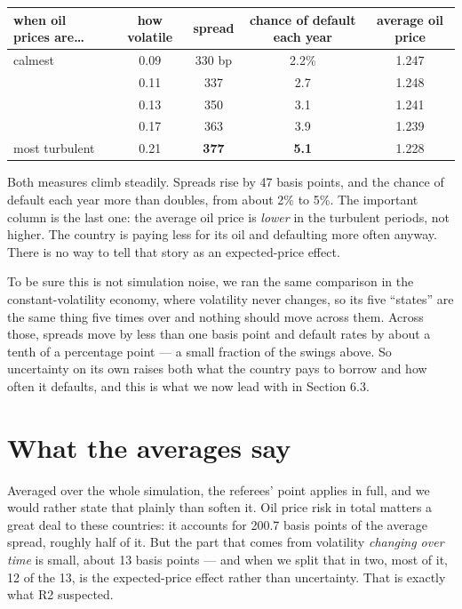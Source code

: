 \documentclass[11pt]{article}
\begin{document}
\begin{table}[h]
\centering
\small
\begin{tabular}{lcccc}
\toprule
when oil prices are\ldots & how volatile & spread & chance of default each year & average oil price \\
\midrule
calmest          & 0.09 & 330 bp         & 2.2\%            & 1.247 \\
                 & 0.11 & 337            & 2.7              & 1.248 \\
                 & 0.13 & 350            & 3.1              & 1.241 \\
                 & 0.17 & 363            & 3.9              & 1.239 \\
most turbulent   & 0.21 & \textbf{377}   & \textbf{5.1}     & 1.228 \\
\bottomrule
\end{tabular}
\end{table}

Both measures climb steadily. Spreads rise by 47 basis points, and the chance of
default each year more than doubles, from about 2\% to 5\%. The important column is
the last one: the average oil price is \emph{lower} in the turbulent
periods, not higher. The country is paying less for its oil and defaulting more
often anyway. There is no way to tell that story as an expected-price effect.

To be sure this is not simulation noise, we ran the same comparison in the
constant-volatility economy, where volatility never changes, so its five
``states'' are the same thing five times over and nothing should move across
them. Across those, spreads move by less than one basis point and default rates
by about a tenth of a percentage point --- a small fraction of the swings above.
So uncertainty on its own raises both what the country pays to borrow and how
often it defaults, and this is what we now lead with in Section 6.3.

\section*{What the averages say}

Averaged over the whole simulation, the referees' point applies in full, and we
would rather state that plainly than soften it. Oil price risk in total matters a
great deal to these countries: it accounts for 200.7 basis points of the average
spread, roughly half of it. But the part that comes from volatility
\emph{changing over time} is small, about 13 basis points --- and when we split
that in two, most of it, 12 of the 13, is the expected-price effect rather than
uncertainty. That is exactly what R2 suspected.
\end{document}
